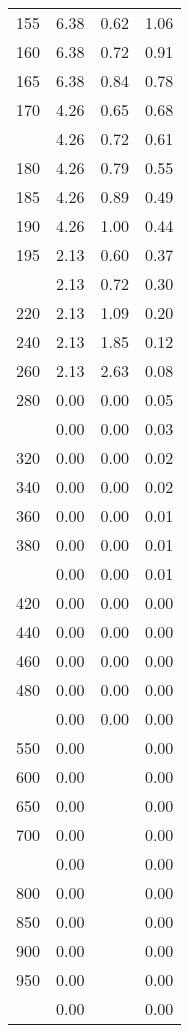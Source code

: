 \begin{table}[ht]
\begin{tabular}{lccc}
  155 & 6.38 & 0.62 & 1.06 \\ 
  160 & 6.38 & 0.72 & 0.91 \\ 
  165 & 6.38 & 0.84 & 0.78 \\ 
  170 & 4.26 & 0.65 & 0.68 \\ 
   \addlinespace
175 & 4.26 & 0.72 & 0.61 \\ 
  180 & 4.26 & 0.79 & 0.55 \\ 
  185 & 4.26 & 0.89 & 0.49 \\ 
  190 & 4.26 & 1.00 & 0.44 \\ 
  195 & 2.13 & 0.60 & 0.37 \\ 
   \addlinespace
200 & 2.13 & 0.72 & 0.30 \\ 
  220 & 2.13 & 1.09 & 0.20 \\ 
  240 & 2.13 & 1.85 & 0.12 \\ 
  260 & 2.13 & 2.63 & 0.08 \\ 
  280 & 0.00 & 0.00 & 0.05 \\ 
   \addlinespace
300 & 0.00 & 0.00 & 0.03 \\ 
  320 & 0.00 & 0.00 & 0.02 \\ 
  340 & 0.00 & 0.00 & 0.02 \\ 
  360 & 0.00 & 0.00 & 0.01 \\ 
  380 & 0.00 & 0.00 & 0.01 \\ 
   \addlinespace
400 & 0.00 & 0.00 & 0.01 \\ 
  420 & 0.00 & 0.00 & 0.00 \\ 
  440 & 0.00 & 0.00 & 0.00 \\ 
  460 & 0.00 & 0.00 & 0.00 \\ 
  480 & 0.00 & 0.00 & 0.00 \\ 
   \addlinespace
500 & 0.00 & 0.00 & 0.00 \\ 
  550 & 0.00 &  & 0.00 \\ 
  600 & 0.00 &  & 0.00 \\ 
  650 & 0.00 &  & 0.00 \\ 
  700 & 0.00 &  & 0.00 \\ 
   \addlinespace
750 & 0.00 &  & 0.00 \\ 
  800 & 0.00 &  & 0.00 \\ 
  850 & 0.00 &  & 0.00 \\ 
  900 & 0.00 &  & 0.00 \\ 
  950 & 0.00 &  & 0.00 \\ 
   \addlinespace
1000 & 0.00 &  & 0.00 \\ 
   \bottomrule
\end{tabular}
\end{table}
